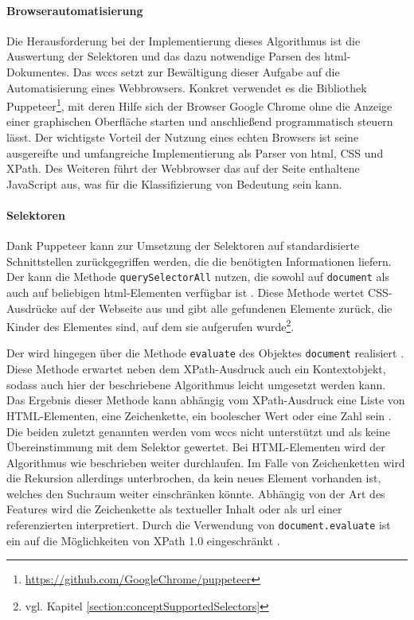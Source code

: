     \paragraph{Browserautomatisierung}
    Die Herausforderung bei der Implementierung dieses Algorithmus
    ist die Auswertung der Selektoren und das dazu notwendige Parsen des \gls{html}-Dokumentes.
    Das \gls{wccs} setzt zur Bewältigung dieser Aufgabe auf die Automatisierung eines Webbrowsers.
    Konkret verwendet es die Bibliothek
    Puppeteer\footnote{\url{https://github.com/GoogleChrome/puppeteer}},
    mit deren Hilfe sich der Browser Google Chrome ohne die Anzeige einer graphischen Oberfläche starten
    und anschließend programmatisch steuern lässt.
    Der wichtigste Vorteil der Nutzung eines echten Browsers ist seine ausgereifte und umfangreiche Implementierung
    als Parser von \gls{html}, CSS und XPath.
    Des Weiteren führt der Webbrowser das auf der Seite enthaltene JavaScript aus,
    was für die Klassifizierung von Bedeutung sein kann.

    \paragraph{Selektoren}
    Dank Puppeteer kann zur Umsetzung der Selektoren auf standardisierte Schnittstellen
    zurückgegriffen werden, die die benötigten Informationen liefern.
    Der {\cssSelector} kann die Methode \texttt{querySelectorAll} nutzen,
    die sowohl auf \texttt{document} als auch auf beliebigen \gls{html}-Elementen verfügbar ist
    \cite[Kapitel 6.1]{w3c:selectorsAPI}.
    Diese Methode wertet CSS-Ausdrücke auf der Webseite aus und gibt alle gefundenen Elemente zurück,
    die Kinder des Elementes sind, auf dem sie aufgerufen
    wurde\footnote{vgl. Kapitel \ref{section:conceptSupportedSelectors}}.

    Der {\xpathSelector} wird hingegen über die Methode \texttt{evaluate} des Objektes \texttt{document} realisiert
    \cite{w3c:domXPath}.
    Diese Methode erwartet neben dem XPath-Ausdruck auch ein Kontextobjekt,
    sodass auch hier der beschriebene Algorithmus leicht umgesetzt werden kann.
    Das Ergebnis dieser Methode kann abhängig vom XPath-Ausdruck eine Liste von HTML-Elementen, eine Zeichenkette,
    ein boolescher Wert oder eine Zahl sein
    \cite[Kapitel 1.4]{w3c:domXPathResult}.
    Die beiden zuletzt genannten werden vom \gls{wccs} nicht unterstützt und als keine Übereinstimmung mit dem Selektor gewertet.
    Bei HTML-Elementen wird der Algorithmus wie beschrieben weiter durchlaufen.
    Im Falle von Zeichenketten wird die Rekursion allerdings unterbrochen, da kein neues Element vorhanden ist,
    welches den Suchraum weiter einschränken könnte.
    Abhängig von der Art des Features wird die Zeichenkette als textueller Inhalt
    oder als \gls{url} einer referenzierten {\resource} interpretiert.
    Durch die Verwendung von \texttt{document.evaluate} ist ein {\xpathSelector}
    auf die Möglichkeiten von XPath 1.0 eingeschränkt \cite{w3c:domXPath}.

